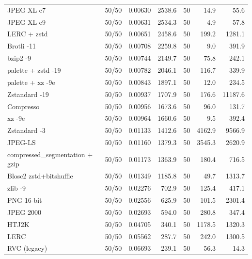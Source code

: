 \begin{table}[t]
\begin{tabular}{lrrrrrr}
JPEG XL e7 & 50/50 & 0.00630 & 2538.6 & 50 & 14.9 & 55.6 \\
JPEG XL e9 & 50/50 & 0.00631 & 2534.3 & 50 & 4.9 & 57.8 \\
LERC + zstd & 50/50 & 0.00651 & 2458.6 & 50 & 199.2 & 1281.1 \\
Brotli -11 & 50/50 & 0.00708 & 2259.8 & 50 & 9.0 & 391.9 \\
bzip2 -9 & 50/50 & 0.00744 & 2149.7 & 50 & 75.8 & 242.1 \\
palette + zstd -19 & 50/50 & 0.00782 & 2046.1 & 50 & 116.7 & 339.9 \\
palette + xz -9e & 50/50 & 0.00843 & 1897.1 & 50 & 12.0 & 234.5 \\
Zstandard -19 & 50/50 & 0.00937 & 1707.9 & 50 & 176.6 & 11187.6 \\
Compresso & 50/50 & 0.00956 & 1673.6 & 50 & 96.0 & 131.7 \\
xz -9e & 50/50 & 0.00964 & 1660.6 & 50 & 9.5 & 392.4 \\
Zstandard -3 & 50/50 & 0.01133 & 1412.6 & 50 & 4162.9 & 9566.9 \\
JPEG-LS & 50/50 & 0.01160 & 1379.3 & 50 & 3545.3 & 2620.9 \\
compressed\_segmentation + gzip & 50/50 & 0.01173 & 1363.9 & 50 & 180.4 & 716.5 \\
Blosc2 zstd+bitshuffle & 50/50 & 0.01349 & 1185.8 & 50 & 49.7 & 1313.7 \\
zlib -9 & 50/50 & 0.02276 & 702.9 & 50 & 125.4 & 417.1 \\
PNG 16-bit & 50/50 & 0.02556 & 625.9 & 50 & 101.5 & 2301.4 \\
JPEG 2000 & 50/50 & 0.02693 & 594.0 & 50 & 280.8 & 347.4 \\
HTJ2K & 50/50 & 0.04705 & 340.1 & 50 & 1178.5 & 1320.3 \\
LERC & 50/50 & 0.05562 & 287.7 & 50 & 242.0 & 1300.5 \\
RVC (legacy) & 50/50 & 0.06693 & 239.1 & 50 & 56.3 & 14.3 \\
\hline
\end{tabular}
\end{table}
